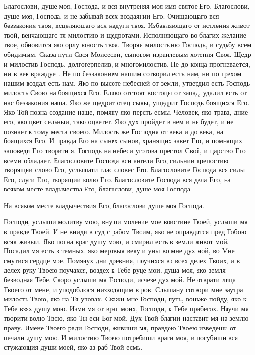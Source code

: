 \begin{mymulticols}
Благослови, душе моя, Господа, и вся внутреняя моя имя святое Его. Благослови, душе моя, Господа, и не забывай всех воздаянии Его. Очищающаго вся беззакония твоя, исцеляющаго вся недуги твоя. Избавляющаго от истления живот твой, венчающаго тя милостию и щедротами. Исполняющаго во благих желание твое, обновится яко орлу юность твоя. Творяи милостыню Господь, и судьбу всем обидимым. Сказа пути Своя Моисеови, сыновом израилевым хотения Своя. Щедр и милостив Господь, долготерпелив, и многомилостив. Не до конца прогневается, ни в век враждует. Не по беззаконием нашим сотворил есть нам, ни по грехом нашим воздал есть нам. Яко по высоте небесней от земли, утвердил есть Господь милость Свою на боящихся Его. Елико отстоят востоцы от запад, удалил есть от нас беззакония наша. Яко же щедрит отец сыны, ущедрит Господь боящихся Его. Яко Той позна создание наше, помяну яко персть есмы. Человек, яко трава, дние его, яко цвет сельныи, тако оцветет. Яко дух пройдет в нем и не будет, и не познает к тому места своего. Милость же Господня от века и до века, на боящихся Его. И правда Его на сынех сынов, хранящих завет Его, и помнящих заповеди Его творити я. Господь на небеси уготова престол Свой, и царство Его всеми обладает. Благословите Господа вси ангели Его, сильнии крепостию творящии слово Его, услышати глас словес Его. Благословите Господа вся силы Его, слуги Его, творящии волю Его. Благословите Господа вся дела Его, на всяком месте владычества Его, благослови, душе моя Господа.

На всяком месте владычествия Его, благослови душе моя Господа.




Господи, услыши молитву мою, внуши моление мое воистине Твоей, услыши мя в правде Твоей. И не вниди в суд с рабом Твоим, яко не оправдится пред Тобою всяк живыи. Яко погна враг душу мою, и смирил есть в земли живот мой. Посадил мя есть в темных, яко мертвыя веку и уны во мне дух мой, во Мне смутися сердце мое. Помянух дни древния, поучихся во всех делех Твоих, и в делех руку Твоею поучахся, воздех к Тебе руце мои, душа моя, яко земля безводная Тебе. Скоро услыши мя Господи, исчезе дух мой. Не отврати лица Твоего от мене, и уподоблюся низходящим в ров. Слышану сотвори мне заутра милость Твою, яко на Тя уповах. Скажи мне Господи, путь, воньже пойду, яко к Тебе взях душу мою. Изми мя от враг моих, Господи, к Тебе прибегох. Научи мя творити волю Твою, яко Ты еси Бог мой. Дух Твой благии наставит мя на землю праву. Имене Твоего ради Господи, живиши мя, правдою Твоею изведеши от печали душу мою. И милостию Твоею потребиши враги моя, и погубиши вся стужающия души моей, яко аз раб Твой есмь.


\end{mymulticols}
